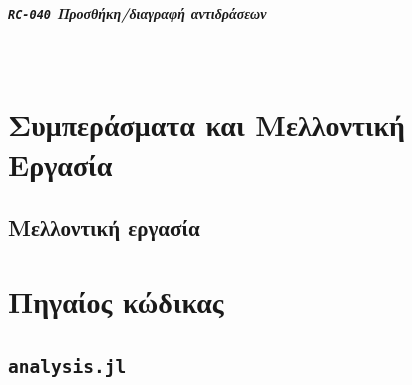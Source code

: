 \documentclass[a4paper,nobib]{tufte-book}
\begin{document}

\paragraph{\textbf{\texttt{RC-040} Προσθήκη/διαγραφή αντιδράσεων}}~


\chapter{Συμπεράσματα και Μελλοντική Εργασία}


\label{cap:conclusion}


\section{Μελλοντική εργασία}


\appendix

\begin{fullwidth}
\printbibliography[heading=bibnumbered,title={Βιβλιογραφία}]
\end{fullwidth}


\printindex

\chapter{Πηγαίος κώδικας}
\label{sec:source_code}



\section*{\texttt{analysis.jl}}
\label{app:analysisjl}

\begin{fullwidth}
\end{fullwidth}

\inputminted{julia}{analysis/comparisons_el.jl}
\end{document}
